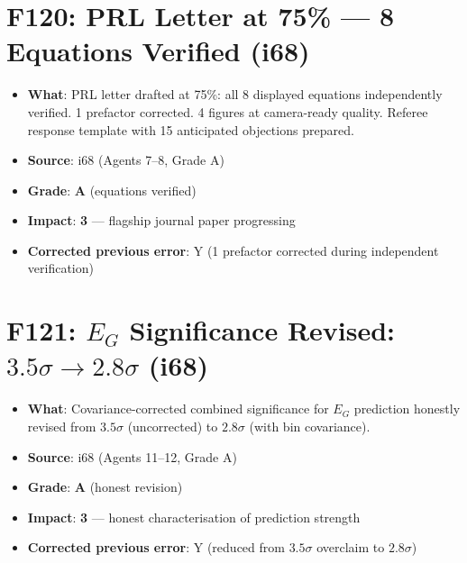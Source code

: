 \documentclass[11pt,a4paper]{article}
\newcommand{\grade}[1]{\textbf{#1}}
\newcommand{\impact}[1]{\textbf{#1}}
\begin{document}
\section{F120: PRL Letter at 75\% --- 8 Equations Verified (i68)}
\begin{itemize}[nosep]
\item \textbf{What}: PRL letter drafted at 75\%: all 8 displayed equations independently verified. 1 prefactor corrected. 4 figures at camera-ready quality. Referee response template with 15 anticipated objections prepared.
\item \textbf{Source}: i68 (Agents 7--8, Grade A)
\item \textbf{Grade}: \grade{A} (equations verified)
\item \textbf{Impact}: \impact{3} --- flagship journal paper progressing
\item \textbf{Corrected previous error}: Y (1 prefactor corrected during independent verification)
\end{itemize}

\section{F121: $E_G$ Significance Revised: $3.5\sigma \to 2.8\sigma$ (i68)}
\begin{itemize}[nosep]
\item \textbf{What}: Covariance-corrected combined significance for $E_G$ prediction honestly revised from $3.5\sigma$ (uncorrected) to $2.8\sigma$ (with bin covariance).
\item \textbf{Source}: i68 (Agents 11--12, Grade A)
\item \textbf{Grade}: \grade{A} (honest revision)
\item \textbf{Impact}: \impact{3} --- honest characterisation of prediction strength
\item \textbf{Corrected previous error}: Y (reduced from $3.5\sigma$ overclaim to $2.8\sigma$)
\end{itemize}

\end{document}
